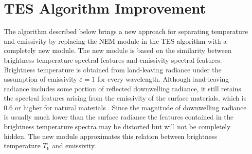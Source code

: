 \section{TES Algorithm Improvement}

The algorithm described below brings a new approach for separating temperature and emissivity by replacing the NEM module in the TES algorithm with a completely new module. The new module is based on the similarity between brightness temperature spectral features and emissivity spectral features. Brightness temperature is obtained from land-leaving radiance under the assumption of emissivity $\varepsilon=1$ for every wavelength. Although land-leaving radiance includes some portion of reflected downwelling radiance, it still retains the spectral features arising from the emissivity of the surface materials, which is $0.6$ or higher for natural materials \cite{GR98}. Since the magnitude of downwelling radiance is usually much lower than the surface radiance the features contained in the brightness temperature spectra may be distorted but will not be completely hidden. The new module approximates this relation between brightness temperature $T_\mathrm{b}$ and emissivity.


